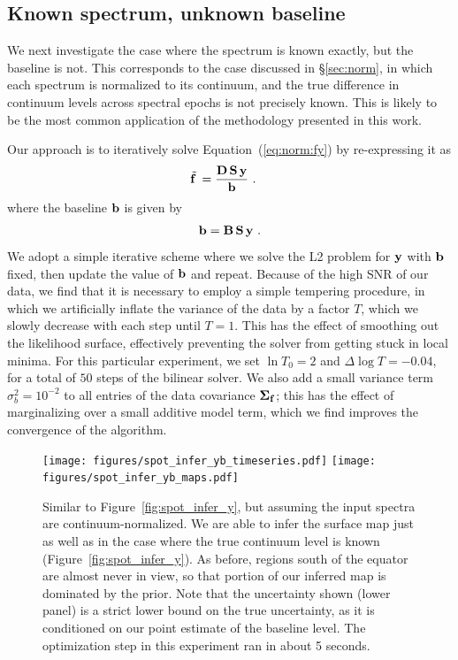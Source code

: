 \documentclass[modern]{aastex631}
\def\timeInferYB{about 5 seconds}
\begin{document}
\subsection{Known spectrum, unknown baseline}
\label{sec:spot_y1b}
%
We next investigate the case where the spectrum is known exactly, but the baseline is not. 
This corresponds to the case discussed in \S\ref{sec:norm}, in which each spectrum is normalized to its continuum, and the true difference in continuum levels across spectral epochs is not precisely known.
This is likely to be the most common application of the methodology presented in this work.

Our approach is to iteratively solve Equation~(\ref{eq:norm:fy}) by re-expressing it as
%
\begin{align}
    \tilde{{\mathbf{f}}\hspace{0.2em}}
     & =
    \frac{
        {\mathbf{D}}
        \,
        {\mathbf{S}}
        \,
        {\mathbf{y}}
    }{
        {\mathbf{b}}
    }
    \hskip 0.33em.
\end{align}
%
where the baseline ${\mathbf{b}}$ is given by
%
\begin{align}
    {\ensuremath{\mathbf{b}}}
    =
    {\mathbf{B}}
    \,
    {\mathbf{S}}
    \,
    {\mathbf{y}}
    \hskip 0.33em.
\end{align}
%
We adopt a simple iterative scheme where we solve the L2 problem for ${\mathbf{y}}$ with ${\mathbf{b}}$ fixed, then update the value of ${\mathbf{b}}$ and repeat.
Because of the high SNR of our data, we find that it is necessary to employ a simple tempering procedure, in which we artificially inflate the variance of the data by a factor $T$, which we slowly decrease with each step until $T = 1$. 
This has the effect of smoothing out the likelihood surface, effectively preventing the solver from getting stuck in local minima.
For this particular experiment, we set $\ln T_0 = 2$ and $\Delta \log T = -0.04$, for a total of $50$ steps of the bilinear solver.
We also add a small variance term $\sigma_b^2 = 10^{-2}$ to all entries of the data covariance $\boldsymbol{\Sigma}_{{\mathbf{f}}}$; this has the effect of marginalizing over a small additive model term, which we find improves the convergence of the algorithm.

\begin{figure}[p!]
    \begin{centering}
        \texttt{[image: figures/spot\_infer\_yb\_timeseries.pdf]}
        \texttt{[image: figures/spot\_infer\_yb\_maps.pdf]}
        \caption{%
            Similar to Figure~\ref{fig:spot_infer_y}, but assuming the input spectra are continuum-normalized.
            We are able to infer the surface map just as well as in the case where the true continuum level is known (Figure~\ref{fig:spot_infer_y}). 
            As before, regions south of the equator are almost never in view, so that portion of our inferred map is dominated by the prior.
            Note that the uncertainty shown (lower panel) is a strict lower bound on the true uncertainty, as it is conditioned on our point estimate of the baseline level.
            The optimization step in this experiment ran in \timeInferYB.
        }
        \label{fig:spot_infer_yb}
    \end{centering}
\end{figure}
\end{document}
